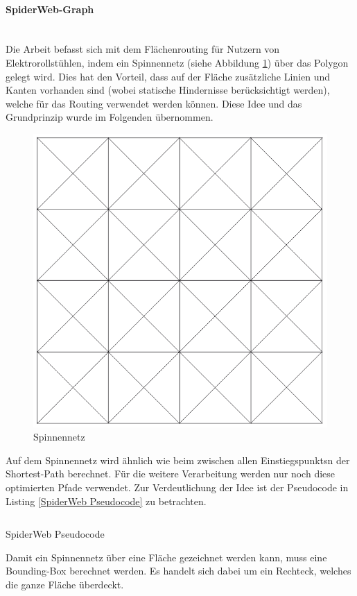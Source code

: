 \paragraph{SpiderWeb-Graph}\label{solution:SpiderWeb-Graph}~\\
Die Arbeit \cite{dzafic_spider_web_graph} befasst sich mit dem Flächenrouting für Nutzern von Elektrorollstühlen, indem ein Spinnennetz (siehe Abbildung \ref{fig:spiderweb}) über das Polygon gelegt wird. Dies hat den Vorteil, dass auf der Fläche zusätzliche Linien und Kanten vorhanden sind (wobei statische Hindernisse berücksichtigt werden), welche für das Routing verwendet werden können. Diese Idee und das Grundprinzip wurde im Folgenden übernommen.

\begin{figure}[ht]
\centering
\includegraphics[width=0.5\linewidth]{technicalreport/img/spiderweb}
\caption[Spinnennetz]{Spinnennetz}
\label{fig:spiderweb}
\end{figure}

Auf dem Spinnennetz wird ähnlich wie beim  zwischen allen \glspl{Einstiegspunkt}n der Shortest-Path berechnet. Für die weitere Verarbeitung werden nur noch diese optimierten Pfade verwendet. Zur Verdeutlichung der Idee ist der Pseudocode in Listing \ref{SpiderWeb Pseudocode} zu betrachten.

\begin{listing}[ht]
    \inputminted{python}{technicalreport/listing/spiderweb_pseudocode.py}
    \caption{SpiderWeb Pseudocode}
    \label{SpiderWeb Pseudocode}
\end{listing}

Damit ein Spinnennetz über eine Fläche gezeichnet werden kann, muss eine Bounding-Box berechnet werden. Es handelt sich dabei um ein Rechteck, welches die ganze Fläche überdeckt. 

